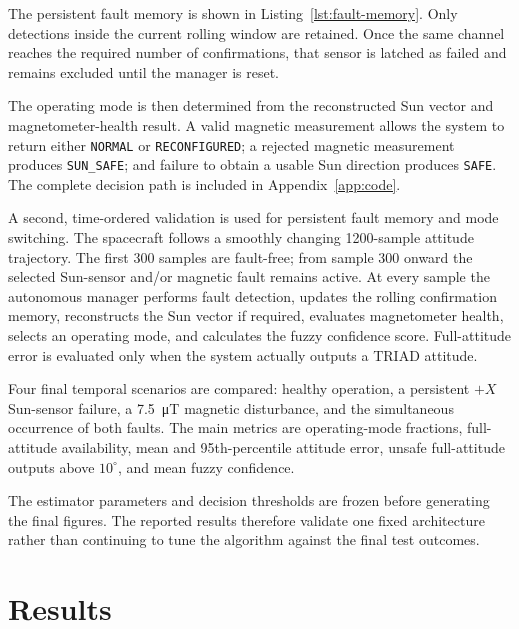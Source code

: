 \documentclass[11pt,a4paper]{article}
\begin{document}
The persistent fault memory is shown in Listing~\ref{lst:fault-memory}. Only detections inside the current rolling window are retained. Once the same channel reaches the required number of confirmations, that sensor is latched as failed and remains excluded until the manager is reset.



The operating mode is then determined from the reconstructed Sun vector and magnetometer-health result. A valid magnetic measurement allows the system to return either \texttt{NORMAL} or \texttt{RECONFIGURED}; a rejected magnetic measurement produces \texttt{SUN\_SAFE}; and failure to obtain a usable Sun direction produces \texttt{SAFE}. The complete decision path is included in Appendix~\ref{app:code}.



A second, time-ordered validation is used for persistent fault memory and mode switching. The spacecraft follows a smoothly changing 1200-sample attitude trajectory. The first 300 samples are fault-free; from sample 300 onward the selected Sun-sensor and/or magnetic fault remains active. At every sample the autonomous manager performs fault detection, updates the rolling confirmation memory, reconstructs the Sun vector if required, evaluates magnetometer health, selects an operating mode, and calculates the fuzzy confidence score. Full-attitude error is evaluated only when the system actually outputs a TRIAD attitude.

Four final temporal scenarios are compared: healthy operation, a persistent $+X$ Sun-sensor failure, a \SI{7.5}{\micro\tesla} magnetic disturbance, and the simultaneous occurrence of both faults. The main metrics are operating-mode fractions, full-attitude availability, mean and 95th-percentile attitude error, unsafe full-attitude outputs above $10^\circ$, and mean fuzzy confidence.

The estimator parameters and decision thresholds are frozen before generating the final figures. The reported results therefore validate one fixed architecture rather than continuing to tune the algorithm against the final test outcomes.

\clearpage

\section{Results}
\end{document}
